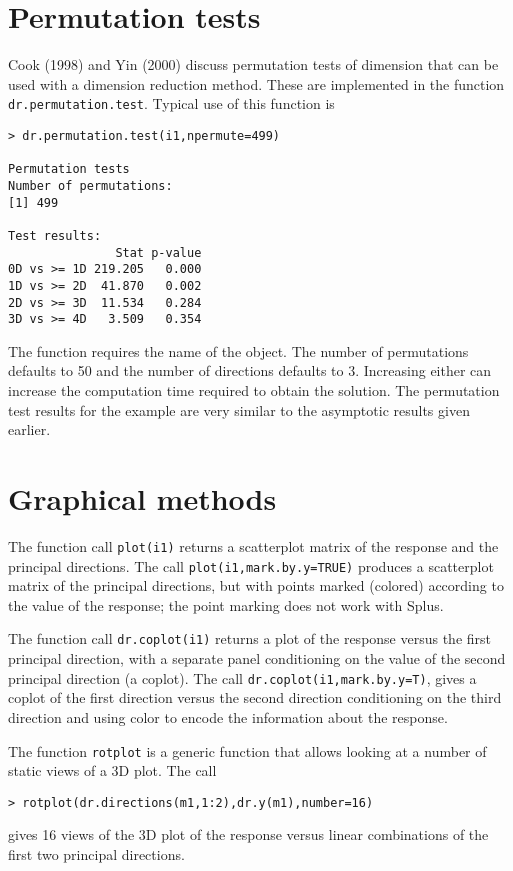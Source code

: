 \documentclass{article}
\newcommand{\Splus}{{\normalfont\textsf{Splus}}{}}
\newcommand{\dcode}[1]{{\small{\tt #1}}}
\begin{document}
\section{Permutation tests}\label{sec:perm}
Cook (1998) and Yin (2000) discuss permutation tests of dimension that can
be used with a dimension reduction method.  These are implemented in the
function \dcode{dr.permutation.test}.  Typical use of this function is
\small\begin{verbatim}
> dr.permutation.test(i1,npermute=499)

Permutation tests
Number of permutations:
[1] 499

Test results:
               Stat p-value
0D vs >= 1D 219.205   0.000
1D vs >= 2D  41.870   0.002
2D vs >= 3D  11.534   0.284
3D vs >= 4D   3.509   0.354
\end{verbatim}
\normalsize
\noindent
The function requires the name of the object.  The number of permutations
defaults to 50 and the number of directions defaults to 3.  Increasing
either can increase the computation time required to obtain the solution.
The permutation test results for the example
are very similar to the asymptotic results given earlier.

\section{Graphical methods}
The function call \dcode{plot(i1)} returns a scatterplot matrix of the
response and the principal directions.  The call
\dcode{plot(i1,mark.by.y=TRUE)} produces a scatterplot matrix of the
principal directions, but with points marked (colored) according to the
value of the response; the point marking does not work with \Splus.

The function call \dcode{dr.coplot(i1)} returns a plot of the response versus
the first principal direction, with a separate panel conditioning on the
value of the second principal direction (a coplot).  The call
\dcode{dr.coplot(i1,mark.by.y=T)}, gives a coplot of the first direction
versus the second direction conditioning on the third direction and using
color to encode the information about the response.

The function \dcode{rotplot} is a generic function that allows looking at a
number of static views of a 3D plot.  The call
\small\begin{verbatim}
> rotplot(dr.directions(m1,1:2),dr.y(m1),number=16)
\end{verbatim}
\normalsize
\noindent
gives 16 views of the 3D plot of the response versus linear combinations of
the first two principal directions.
\end{document}
